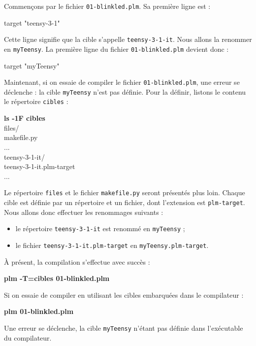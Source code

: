 Commençons par le fichier \texttt{01-blinkled.plm}. Sa première ligne est :

\begin{PLM}[1]
target "teensy-3-1"
\end{PLM}

Cette ligne signifie que la cible s'appelle \texttt{teensy-3-1-it}. Nous allons la renommer en \texttt{myTeensy}. La première ligne du fichier \texttt{01-blinkled.plm} devient donc :

\begin{PLM}[1]
target "myTeensy"
\end{PLM}

Maintenant, si on essaie de compiler le fichier \texttt{01-blinkled.plm}, une erreur se déclenche : la cible \texttt{myTeensy} n'est pas définie. Pour la définir, listons le contenu le répertoire \texttt{cibles} :
\begin{SHELL}
{\bfseries ls -1F cibles}\\
files/\\
makefile.py\\
...\\
teensy-3-1-it/\\
teensy-3-1-it.plm-target\\
...
\end{SHELL}

Le répertoire \texttt{files} et le fichier \texttt{makefile.py} seront présentés plus loin. Chaque cible est définie par un répertoire et un fichier, dont l'extension est \texttt{plm-target}. Nous allons donc effectuer les renommages suivants :
\begin{itemize}
  \item le répertoire \texttt{teensy-3-1-it} est renommé en \texttt{myTeensy} ;
  \item le fichier \texttt{teensy-3-1-it.plm-target} en \texttt{myTeensy.plm-target}.
\end{itemize}

À présent, la compilation s'effectue avec succès :
\begin{SHELL}
\bfseries plm -T=cibles 01-blinkled.plm
\end{SHELL}

Si on essaie de compiler en utilisant les cibles embarquées dans le compilateur :
\begin{SHELL}
\bfseries plm 01-blinkled.plm
\end{SHELL}

Une erreur se déclenche, la cible \texttt{myTeensy} n'étant pas définie dans l'exécutable du compilateur.






